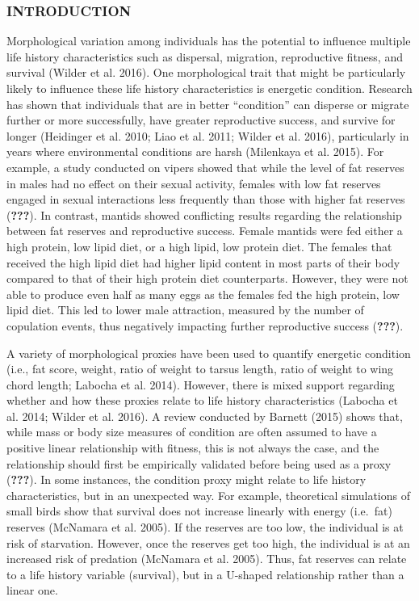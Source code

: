 \documentclass[
]{article}
\begin{document}
\hypertarget{introduction}{%
\subsubsection{INTRODUCTION}\label{introduction}}

Morphological variation among individuals has the potential to influence
multiple life history characteristics such as dispersal, migration,
reproductive fitness, and survival (Wilder et al. 2016). One
morphological trait that might be particularly likely to influence these
life history characteristics is energetic condition. Research has shown
that individuals that are in better ``condition'' can disperse or
migrate further or more successfully, have greater reproductive success,
and survive for longer (Heidinger et al. 2010; Liao et al. 2011; Wilder
et al. 2016), particularly in years where environmental conditions are
harsh (Milenkaya et al. 2015). For example, a study conducted on vipers
showed that while the level of fat reserves in males had no effect on
their sexual activity, females with low fat reserves engaged in sexual
interactions less frequently than those with higher fat reserves
({\textbf{???}}). In contrast, mantids showed conflicting results
regarding the relationship between fat reserves and reproductive
success. Female mantids were fed either a high protein, low lipid diet,
or a high lipid, low protein diet. The females that received the high
lipid diet had higher lipid content in most parts of their body compared
to that of their high protein diet counterparts. However, they were not
able to produce even half as many eggs as the females fed the high
protein, low lipid diet. This led to lower male attraction, measured by
the number of copulation events, thus negatively impacting further
reproductive success ({\textbf{???}}).

A variety of morphological proxies have been used to quantify energetic
condition (i.e., fat score, weight, ratio of weight to tarsus length,
ratio of weight to wing chord length; Labocha et al. 2014). However,
there is mixed support regarding whether and how these proxies relate to
life history characteristics (Labocha et al. 2014; Wilder et al. 2016).
A review conducted by Barnett (2015) shows that, while mass or body size
measures of condition are often assumed to have a positive linear
relationship with fitness, this is not always the case, and the
relationship should first be empirically validated before being used as
a proxy ({\textbf{???}}). In some instances, the condition proxy might
relate to life history characteristics, but in an unexpected way. For
example, theoretical simulations of small birds show that survival does
not increase linearly with energy (i.e.~fat) reserves (McNamara et al.
2005). If the reserves are too low, the individual is at risk of
starvation. However, once the reserves get too high, the individual is
at an increased risk of predation (McNamara et al. 2005). Thus, fat
reserves can relate to a life history variable (survival), but in a
U-shaped relationship rather than a linear one.
\end{document}
